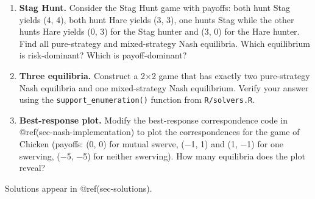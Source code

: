 \documentclass[
]{article}
\begin{document}
\begin{enumerate}
\def\labelenumi{\arabic{enumi}.}
\item
  \textbf{Stag Hunt.} Consider the Stag Hunt game with payoffs: both
  hunt Stag yields (4, 4), both hunt Hare yields (3, 3), one hunts Stag
  while the other hunts Hare yields (0, 3) for the Stag hunter and (3,
  0) for the Hare hunter. Find all pure-strategy and mixed-strategy Nash
  equilibria. Which equilibrium is risk-dominant? Which is
  payoff-dominant?
\item
  \textbf{Three equilibria.} Construct a 2×2 game that has exactly two
  pure-strategy Nash equilibria and one mixed-strategy Nash equilibrium.
  Verify your answer using the \texttt{support\_enumeration()} function
  from \texttt{R/solvers.R}.
\item
  \textbf{Best-response plot.} Modify the best-response correspondence
  code in @ref(sec-nash-implementation) to plot the correspondences for
  the game of Chicken (payoffs: (0, 0) for mutual swerve, (−1, 1) and
  (1, −1) for one swerving, (−5, −5) for neither swerving). How many
  equilibria does the plot reveal?
\end{enumerate}

Solutions appear in @ref(sec-solutions).
\end{document}
